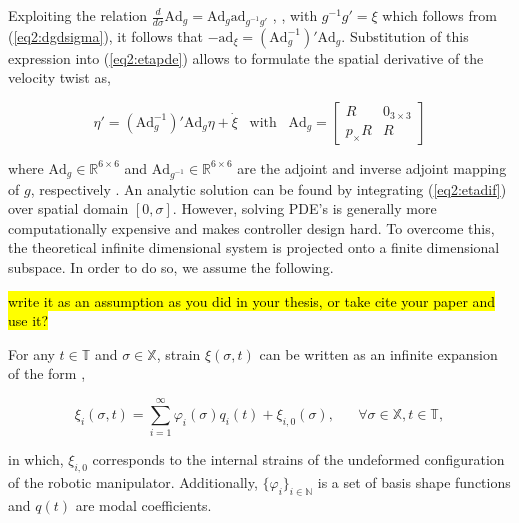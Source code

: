 Exploiting the relation $\frac{d}{d \sigma} \text{Ad}_g = \text{Ad}_g \text{ad}_{g^{-1}g'}$ \cite{Boyer2019}, \cite{traversaro2016multibody} , with $g^{-1}g' = \xi$ which follows from (\ref{eq2:dgdsigma}), it follows that $-\text{ad}_\xi = (\text{Ad}_g^{-1})'\text{Ad}_g$. Substitution of this expression into (\ref{eq2:etapde}) allows to formulate the spatial derivative of the velocity twist as,

\begin{equation}
    \eta'= (\text{Ad}_g^{-1})'\text{Ad}_g \eta + \Dot{\xi} \hspace{10pt} \text{with} \hspace{10pt} \text{Ad}_g = \begin{bmatrix} R & 0_{3\times 3} \\ p_\times R & R \end{bmatrix}
    \label{eq2:etadif}
\end{equation}

where $\text{Ad}_g \in \mathbb{R}^{6 \times 6}$ and $\text{Ad}_{g^{-1}}  \in \mathbb{R}^{6 \times 6}$ are the adjoint and inverse adjoint mapping of $g$, respectively \cite{Sola2018}. An analytic solution can be found by integrating (\ref{eq2:etadif}) over spatial domain $[0,\sigma]$. However, solving PDE's is generally more computationally expensive and makes controller design hard.
To overcome this, the theoretical infinite dimensional system is projected onto a finite dimensional subspace. In order to do so, we assume the following.

\hl{write it as an assumption as you did in your thesis, or take cite your paper and use it?}

\begin{theorem}

For any $t \in \mathbb{T}$ and $\sigma \in \mathbb{X}$, strain $\xi(\sigma,t)$ can be written as an infinite expansion of the form \cite{Caasenbrood2021},

\begin{equation}
\xi_i(\sigma,t) = \sum_{i=1}^\infty \varphi_i(\sigma)q_i(t) + \xi_{i,0}(\sigma), \hspace{20pt} \forall \sigma \in \mathbb{X}, t \in \mathbb{T},
\label{eq2:strainexact}
\end{equation}

in which, $\xi_{i,0}$ corresponds to the internal strains of the undeformed configuration of the robotic manipulator. Additionally, $\{\varphi_i\}_{i \in \mathbb{N}}$ is a set of basis shape functions and $q(t)$ are modal coefficients. 
\end{theorem}

